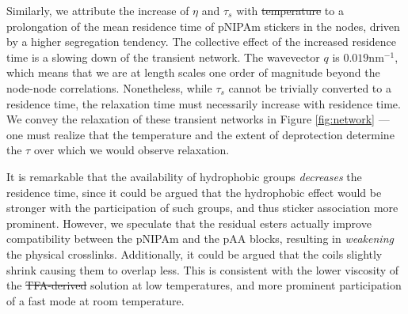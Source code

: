 \documentclass{article}
\providecommand{\DIFadd}[1]{{\protect\color{blue}\uwave{#1}}} %
\providecommand{\DIFdel}[1]{{\protect\color{red}\sout{#1}}}                      %
\providecommand{\DIFaddbegin}{} %
\providecommand{\DIFaddend}{} %
\providecommand{\DIFdelbegin}{} %
\providecommand{\DIFdelend}{} %
\begin{document}
Similarly, we attribute the increase of $\eta$ and $\tau_s$ with \DIFdelbegin \DIFdel{temperature
}\DIFdelend \DIFaddbegin \DIFadd{$T$ 
}\DIFaddend to a prolongation of the mean residence time of pNIPAm stickers in the nodes, 
driven by a higher segregation tendency. The collective effect of the increased 
residence time is a slowing down of the transient network. The wavevector $q$ is 
$0.019\mathrm{nm}^{-1}$, which means that we 
are at length scales one order of magnitude beyond the node-node correlations.
Nonetheless, while $\tau_s$ cannot be trivially converted to a residence time,
the relaxation time must necessarily increase with residence time.\cite{Bohdan2016} 
We convey the relaxation of these transient networks in Figure 
\ref{fig:network} --- one must realize that the temperature and the extent of 
deprotection determine the $\tau$ over which we would observe relaxation.


It is remarkable that the availability of hydrophobic groups \emph{decreases} the residence time, 
since it could be argued that the hydrophobic effect would be stronger with the participation of such groups, 
and thus sticker association more prominent. However, we speculate that the residual esters 
actually improve compatibility between the pNIPAm and the pAA blocks, 
resulting in \emph{weakening} the physical crosslinks. Additionally, it could 
be argued that the coils slightly shrink causing them to overlap less. This is 
consistent with the lower viscosity of the \DIFdelbegin \DIFdel{TFA-derived }\DIFdelend \DIFaddbegin \DIFadd{N$_\mathrm{24}$-(A$_\mathrm{297}$-T$_\mathrm{33}$)-N$_\mathrm{24}$
}\DIFaddend solution at low temperatures, and more prominent participation of a fast mode at room temperature.
\end{document}
